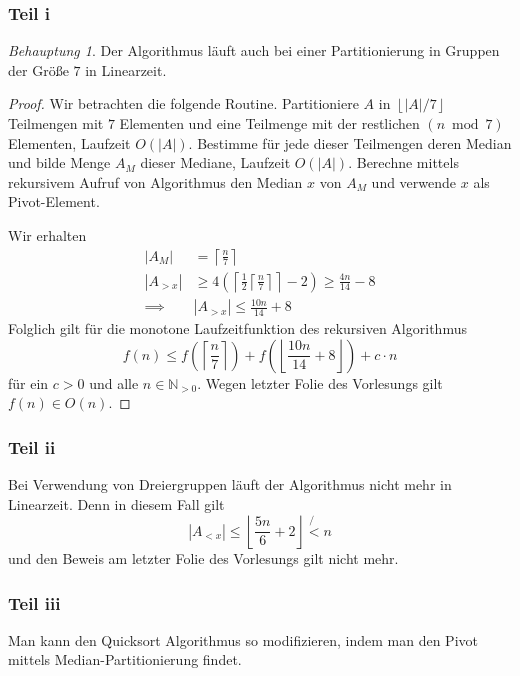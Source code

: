 \documentclass[draft,a5paper]{article}
\providecommand{\abs}[1]{\left\lvert#1\right\rvert}
\providecommand{\ceil}[1]{\left\lceil#1\right\rceil}
\providecommand{\floor}[1]{\left\lfloor#1\right\rfloor}
\theoremstyle{remark}
\newtheorem*{Behauptung}{Behauptung}
\begin{document}
\subsubsection{Teil i}
\begin{Behauptung}
  Der Algorithmus läuft auch bei einer Partitionierung in Gruppen der
  Größe \(7\) in Linearzeit.
\end{Behauptung}
\begin{proof}
  Wir betrachten die folgende Routine.  Partitioniere \(A\) in
  \(\floor{\abs{A}/7}\) Teilmengen mit \(7\) Elementen und eine Teilmenge
  mit der restlichen \((n \bmod 7)\) Elementen, Laufzeit \(O(\abs{A})\).
  Bestimme für jede dieser Teilmengen deren Median und bilde Menge
  \(A_{M}\) dieser Mediane, Laufzeit \(O(\abs{A})\).  Berechne mittels
  rekursivem Aufruf von Algorithmus den Median \(x\) von \(A_{M}\) und
  verwende \(x\) als Pivot-Element.

  Wir erhalten
  \begin{align*}
    \abs{A_{M}} &= \ceil{\frac{n}{7}} \\
    \abs{A_{> x}} &\ge 4 \left(\ceil{\frac{1}{2}\ceil{\frac{n}{7}}} -
                    2\right) \ge \frac{4n}{14} - 8 \\
    \implies &\abs{A_{> x}} \le \frac{10n}{14} + 8
  \end{align*}
  Folglich gilt für die monotone Laufzeitfunktion des rekursiven
  Algorithmus
  \[f(n) \le f\left(\ceil{\frac{n}{7}}\right) +
    f\left(\floor{\frac{10n}{14} + 8}\right) + c \cdot n\]
  für ein \(c > 0\) und alle \(n \in \mathbb{N}_{> 0}\).
  Wegen letzter Folie des Vorlesungs gilt \(f(n) \in O(n)\).
\end{proof}
\subsubsection{Teil ii}
Bei Verwendung von Dreiergruppen läuft der Algorithmus nicht mehr in
Linearzeit.  Denn in diesem Fall gilt
\[\abs{A_{< x}} \le \floor{\frac{5n}{6}+2} \not{<} n\]
und den Beweis am letzter Folie des Vorlesungs gilt nicht mehr.
\subsubsection{Teil iii}
Man kann den Quicksort Algorithmus so modifizieren, indem man den
Pivot mittels Median-Partitionierung findet.
\end{document}
